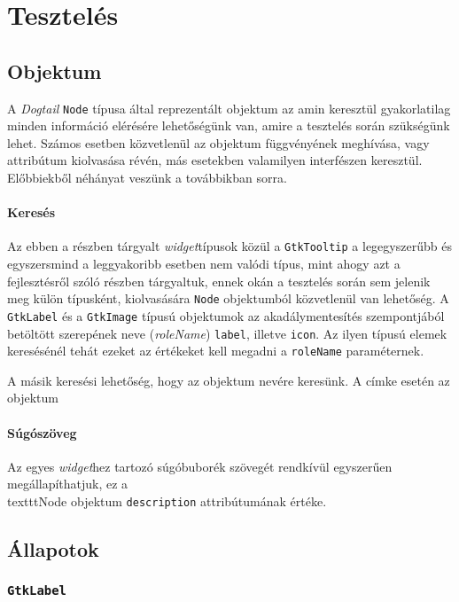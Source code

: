 \section{Tesztelés}

\subsection{Objektum}

A \textit{Dogtail} \texttt{Node} típusa által reprezentált objektum az amin keresztül gyakorlatilag minden információ elérésére lehetőségünk van, amire a tesztelés során szükségünk lehet. Számos esetben közvetlenül az objektum függvényének meghívása, vagy attribútum kiolvasása révén, más esetekben valamilyen interfészen keresztül. Előbbiekből néhányat veszünk a továbbikban sorra.

\paragraph{Keresés}

Az ebben a részben tárgyalt \textit{widget}típusok közül a \texttt{GtkTooltip} a legegyszerűbb és egyszersmind a leggyakoribb esetben nem valódi típus, mint ahogy azt a fejlesztésről szóló részben tárgyaltuk, ennek okán a tesztelés során sem jelenik meg külön típusként, kiolvasására \texttt{Node} objektumból közvetlenül van lehetőség. A \texttt{GtkLabel} és a \texttt{GtkImage} típusú objektumok az akadálymentesítés szempontjából betöltött szerepének neve (\textit{roleName}) \texttt{label}, illetve \texttt{icon}. Az ilyen típusú elemek keresésénél tehát ezeket az értékeket kell megadni a \texttt{roleName} paraméternek.

A másik keresési lehetőség, hogy az objektum nevére keresünk. A címke esetén az objektum 

\paragraph{Súgószöveg}

Az egyes \textit{widget}hez tartozó súgóbuborék szövegét rendkívül egyszerűen megállapíthatjuk, ez a \\texttt{Node} objektum \texttt{description} attribútumának értéke.

\subsection{Állapotok}

\subsubsection{\texttt{GtkLabel}}

